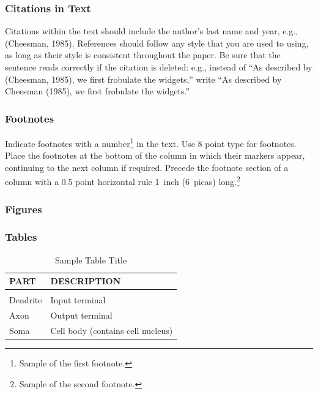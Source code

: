 \documentclass[twoside]{article}
\begin{document}
\subsubsection{Citations in Text}

Citations within the text should include the author's last name and
year, e.g., (Cheesman, 1985). References should follow any style that
you are used to using, as long as their style is consistent throughout
the paper.  Be sure that the sentence reads correctly if the citation
is deleted: e.g., instead of ``As described by (Cheesman, 1985), we
first frobulate the widgets,'' write ``As described by Cheesman
(1985), we first frobulate the widgets.''  %

\subsubsection{Footnotes}

Indicate footnotes with a number\footnote{Sample of the first
  footnote.} in the text. Use 8 point type for footnotes. Place the
footnotes at the bottom of the column in which their markers appear,
continuing to the next column if required. Precede the footnote
section of a column with a 0.5 point horizontal rule 1~inch (6~picas)
long.\footnote{Sample of the second footnote.}

\subsubsection{Figures}


\subsubsection{Tables}


\begin{table}[h]
\caption{Sample Table Title} \label{sample-table}
\begin{center}
\begin{tabular}{ll}
\textbf{PART}  &\textbf{DESCRIPTION} \\
\hline \\
Dendrite         &Input terminal \\
Axon             &Output terminal \\
Soma             &Cell body (contains cell nucleus) \\
\end{tabular}
\end{center}
\end{table}
\end{document}
